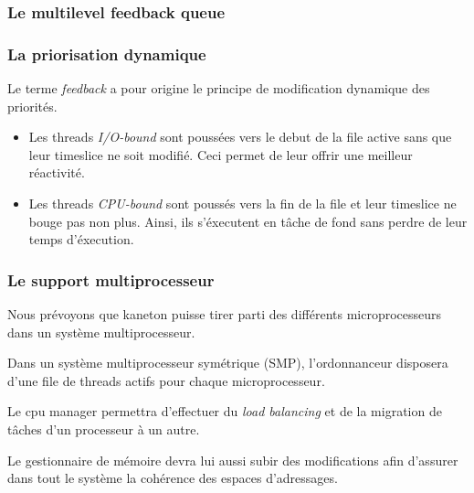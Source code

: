 
\begin{frame}
  \frametitle{Le multilevel feedback queue}

  \begin{center}
  \end{center}
\end{frame}


\begin{frame}
  \frametitle{La priorisation dynamique}

  Le terme \emph{feedback} a pour origine le principe de
  modification dynamique des priorit\'{e}s.

  \begin{itemize}
  \item
    Les threads \emph{I/O-bound} sont pouss\'{e}es vers le debut de la
    file active sans que leur timeslice ne soit modifi\'{e}. Ceci permet
    de leur offrir une meilleur r\'{e}activit\'{e}.
  \item
    Les threads \emph{CPU-bound} sont pouss\'{e}s vers la fin de la file
    et leur timeslice ne bouge pas non plus. Ainsi, ils s'\'{e}xecutent en
    tâche de fond sans perdre de leur temps d'\'{e}xecution.
  \end{itemize}

\end{frame}


\begin{frame}
  \frametitle{Le support multiprocesseur}

  Nous pr\'{e}voyons que kaneton puisse tirer parti des diff\'{e}rents
  microprocesseurs dans un syst\`{e}me multiprocesseur.

  \-

  Dans un syst\`{e}me multiprocesseur sym\'{e}trique (SMP),
  l'ordonnanceur disposera d'une file de threads actifs pour chaque
  microprocesseur.

  Le cpu manager permettra d'effectuer du \emph{load balancing} et de
  la migration de t\^{a}ches d'un processeur \`{a} un autre.

  \-

  Le gestionnaire de m\'{e}moire devra lui aussi subir des
  modifications afin d'assurer dans tout le syst\`{e}me la
  coh\'{e}rence des espaces d'adressages.

\end{frame}


